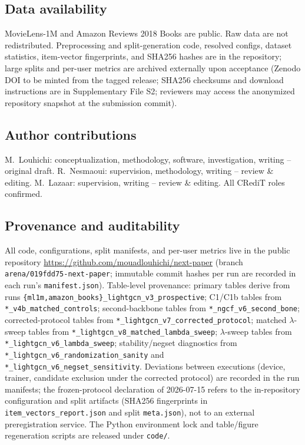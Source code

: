 \documentclass[pdflatex,sn-mathphys-num]{sn-jnl}
\begin{document}
\subsection*{Data availability}
MovieLens-1M and Amazon Reviews 2018 Books are public. Raw data are not redistributed. Preprocessing and split-generation code, resolved configs, dataset statistics, item-vector fingerprints, and SHA256 hashes are in the repository; large splits and per-user metrics are archived externally upon acceptance (Zenodo DOI to be minted from the tagged release; SHA256 checksums and download instructions are in Supplementary File S2; reviewers may access the anonymized repository snapshot at the submission commit).

\subsection*{Author contributions}
M.\ Louhichi: conceptualization, methodology, software, investigation, writing -- original draft. R.\ Nesmaoui: supervision, methodology, writing -- review \& editing. M.\ Lazaar: supervision, writing -- review \& editing. All CRediT roles confirmed.

\subsection*{Provenance and auditability}
All code, configurations, split manifests, and per-user metrics live in the public repository \url{https://github.com/mouadlouhichi/next-paper} (branch \texttt{arena/019fdd75-next-paper}; immutable commit hashes per run are recorded in each run's \texttt{manifest.json}). Table-level provenance: primary tables derive from runs \texttt{\{ml1m,amazon\_books\}\_lightgcn\_v3\_prospective}; C1/C1b tables from \texttt{*\_v4b\_matched\_controls}; second-backbone tables from \texttt{*\_ngcf\_v6\_second\_bone}; corrected-protocol tables from \texttt{*\_lightgcn\_v7\_corrected\_protocol}; matched $\lambda$-sweep tables from \texttt{*\_lightgcn\_v8\_matched\_lambda\_sweep}; $\lambda$-sweep tables from \texttt{*\_lightgcn\_v6\_lambda\_sweep}; stability/negset diagnostics from \texttt{*\_lightgcn\_v6\_randomization\_sanity} and \texttt{*\_lightgcn\_v6\_negset\_sensitivity}. Deviations between executions (device, trainer, candidate exclusion under the corrected protocol) are recorded in the run manifests; the frozen-protocol declaration of 2026-07-15 refers to the in-repository configuration and split artifacts (SHA256 fingerprints in \texttt{item\_vectors\_report.json} and split \texttt{meta.json}), not to an external preregistration service. The Python environment lock and table/figure regeneration scripts are released under \texttt{code/}.


\end{document}
